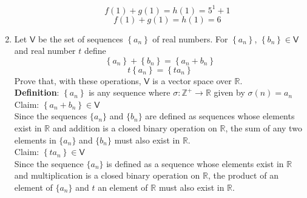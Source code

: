 \documentclass[letterpaper,12pt]{article}
\newcommand{\tab}{\hspace*{1.5em}}
\newcommand{\?}{\stackrel{?}{=}}
\begin{document}
\begin{spacing}{1.5}
\begin{enumerate}
\begin{itemize}
\begin{equation}
f(1) + g(1) = h(1) = 5^1 + 1
\end{equation}
\begin{equation}
f(1) + g(1) = h(1) = 6 
\end{equation}
\end{itemize}
\setcounter{enumi}{19}
\item Let $\mathsf{V}$ be the set of sequences $\left\{a_n\right\}$ of
  real numbers. For $\left\{a_n\right\}$, $\left\{b_n\right\} \in
    \mathsf{V}$ and real number $t$ define 
\[
\left\{a_n\right\}  + \left\{b_n\right\} = \left\{a_n + b_n\right\}
\]
\[
t\left\{a_n\right\} = \left\{ta_n\right\}
\]
Prove that, with these operations, $\mathsf{V}$ is a vector space over
$\mathbb{R}$.
\\
\textbf{Definition}: $\left\{a_n\right\}$ is any sequence where $\sigma \colon
\mathbb{Z}^+ \to \mathbb{R}$ given by $\sigma\left(n\right) = a_n$
\\
Claim: $\left\{a_n + b_n\right\} \in \mathsf{V}$
\\
\tab Since the sequences $\{a_n\}$ and $\{b_n\}$ are defined as sequences
whose elements exist in $\mathbb{R}$ and addition is a closed binary operation on
$\mathbb{R}$, the sum of any two elements in $\{a_n\}$ and $\{b_n\}$ must also
exist in $\mathbb{R}$.
\\
Claim: $\left\{ta_n\right\} \in \mathsf{V}$
\\
\tab Since the sequence $\{a_n\}$ is defined as a sequence whose
elements exist in $\mathbb{R}$ and multiplication is a closed binary operation on
$\mathbb{R}$, the product of an element of $\{a_n\}$ and $t$ an
element of $\mathbb{R}$ must also exist in $\mathbb{R}$.
\end{enumerate}
\end{spacing}
\end{document}
